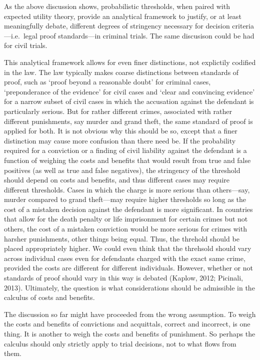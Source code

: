 \documentclass[
  10pt,
  dvipsnames,enabledeprecatedfontcommands]{scrartcl}
\begin{document}
As the above discussion shows, probabilistic thresholds, when paired
with expected utility theory, provide an analytical framework to
justify, or at least meaningfully debate, different degrees of
stringency necessary for decision criteria---i.e.~legal proof
standards---in criminal trials. The same discusison could be had for
civil trials.

This analytical framework allows for even finer distinctions, not
explictily codified in the law. The law typically makes coarse
distinctions between standards of proof, such as `proof beyond a
reasonable doubt' for criminal cases, `preponderance of the evidence'
for civil cases and `clear and convincing evidence' for a narrow subset
of civil cases in which the accusation against the defendant is
particularly serious. But for rather different crimes, associated with
rather different punishments, say murder and grand theft, the same
standard of proof is applied for both. It is not obvious why this should
be so, except that a finer distinction may cause more confusion than
there need be. If the probability required for a conviction or a finding
of civil liability against the defendant is a function of weighing the
costs and benefits that would result from true and false positives (as
well as true and false negatives), the stringency of the threshold
should depend on costs and benefits, and thus different cases may
require different thresholds. Cases in which the charge is more serious
than others---say, murder compared to grand theft---may require higher
thresholds so long as the cost of a mistaken decision against the
defendant is more significant. In countries that allow for the death
penalty or life imprisonment for certain crimes but not others, the cost
of a mistaken conviction would be more serious for crimes with harsher
punishments, other things being equal. Thus, the threhold should be
placed appropriately higher. We could even think that the threhsold
should vary across individual cases even for defendants charged with the
exact same crime, provided the costs are different for different
individuals. However, whether or not standards of proof should vary in
this way is debated (Kaplow, 2012; Picinali, 2013). Ultimately, the
question is what considerations should be admissible in the calculus of
costs and benefits.

The discussion so far might have proceeded from the wrong assumption. To
weigh the costs and benefits of convictions and acquittals, correct and
incorrect, is one thing. It is another to weigh the costs and benefits
of punishment. So perhaps the calculus should only strictly apply to
trial decisions, not to what flows from them.
\end{document}
